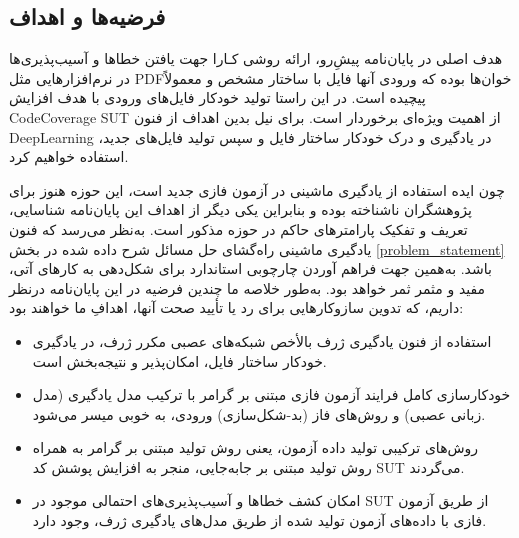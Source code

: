 \subsection{فرضیه‌ها و اهداف}
هدف اصلی در پایان‌نامه پیش‌ِرو، ارائه روشی کـارا جهت یافتن خطاها و آسیب‌پذیری‌ها در نرم‌افزارهایی مثل \gls{PDF}خوان‌ها بوده که ورودی آنها فایل با ساختار مشخص و معمولاً پیچیده است. در این راستا تولید خودکار فایل‌های ورودی با هدف افزایش \gls{CodeCoverage} \gls{SUT} از اهمیت ویژه‌ای برخوردار است. برای نیل بدین اهداف از فنون \gls{DeepLearning} در یادگیری و درک خودکار ساختار فایل و سپس تولید فایل‌های جدید، استفاده خواهیم کرد. 

چون ایده استفاده از یادگیری ماشینی در آزمون فازی جدید است، این حوزه هنوز برای پژوهشگران ناشناخته  بوده و بنابراین یکی دیگر از اهداف این پایان‌نامه شناسایی، تعریف و تفکیک پارامترهای حاکم در حوزه مذکور است.  به‌نظر می‌رسد که فنون یادگیری ماشینی راه‌گشای حل مسائل شرح داده شده در بخش \ref{problem_statement} باشد. به‌همین جهت فراهم آوردن چارچوبی استاندارد برای شکل‌دهی به کارهای آتی، مفید و مثمر ثمر خواهد بود.
به‌طور خلاصه ما چندین فرضیه در این پایان‌نامه درنظر داریم، که تدوین سازوکارهایی برای رد یا تأیید صحت آنها، اهدافِ ما خواهند بود:

\begin{itemize}
	\item{
	استفاده از فنون یادگیری ژرف بالأخص شبکه‌های عصبی مکرر ژرف، در یادگیری خودکار ساختار فایل، امکان‌پذیر و نتیجه‌بخش است.
}


\item{
	خودکارسازی کامل فرایند آزمون فازی مبتنی بر گرامر با ترکیب مدل یادگیری (مدل زبانی عصبی) و روش‌های فاز (بد-شکل‌سازی) ورودی، به خوبی میسر می‌شود.
}

\item{
روش‌های ترکیبی تولید داده آزمون، یعنی روش تولید مبتنی بر گرامر به همراه روش تولید مبتنی بر جابه‌جایی، منجر به افزایش پوشش کد
\gls{SUT}
می‌گردند.
}

\item{
	امکان کشف خطاها و آسیب‌پذیری‌های احتمالی موجود در \gls{SUT} از طریق آزمون فازی با داده‌های آزمون تولید شده از طریق مدل‌های یادگیری ژرف، وجود دارد.
}

\end{itemize}

   

